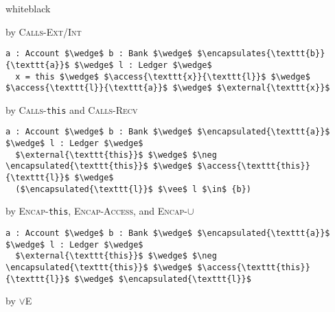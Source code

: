 \begin{proofBox}{white}{black}
\begin{minipage}{0.75\textwidth}
\end{minipage}
\begin{minipage}{0.24\textwidth}
\scriptsize
\hfill by \textsc{Calls-Ext/Int}
\end{minipage}
\begin{minipage}{0.75\textwidth}
\begin{lstlisting}[language = Chainmail, mathescape=true]
a : Account $\wedge$ b : Bank $\wedge$ $\encapsulates{\texttt{b}}{\texttt{a}}$ $\wedge$ l : Ledger $\wedge$ 
  x = this $\wedge$ $\access{\texttt{x}}{\texttt{l}}$ $\wedge$ $\access{\texttt{l}}{\texttt{a}}$ $\wedge$ $\external{\texttt{x}}$
\end{lstlisting}
\end{minipage}
\begin{minipage}{0.24\textwidth}
\scriptsize
\hfill by \textsc{Calls-}\texttt{this} and \textsc{Calls-Recv}
\end{minipage}
\begin{minipage}{0.75\textwidth}
\begin{lstlisting}[language = Chainmail, mathescape=true]
a : Account $\wedge$ b : Bank $\wedge$ $\encapsulated{\texttt{a}}$ $\wedge$ l : Ledger $\wedge$
  $\external{\texttt{this}}$ $\wedge$ $\neg \encapsulated{\texttt{this}}$ $\wedge$ $\access{\texttt{this}}{\texttt{l}}$ $\wedge$ 
  ($\encapsulated{\texttt{l}}$ $\vee$ l $\in$ {b})
\end{lstlisting}
\end{minipage}
\begin{minipage}{0.24\textwidth}
\scriptsize
\hfill by \textsc{Encap-}\texttt{this}, \textsc{Encap-Access}, and \textsc{Encap-}$\cup$
\end{minipage}
\begin{minipage}{0.75\textwidth}
\begin{lstlisting}[language = Chainmail, mathescape=true]
a : Account $\wedge$ b : Bank $\wedge$ $\encapsulated{\texttt{a}}$ $\wedge$ l : Ledger $\wedge$ 
  $\external{\texttt{this}}$ $\wedge$ $\neg \encapsulated{\texttt{this}}$ $\wedge$ $\access{\texttt{this}}{\texttt{l}}$ $\wedge$ $\encapsulated{\texttt{l}}$
\end{lstlisting}
\end{minipage}
\begin{minipage}{0.24\textwidth}
\scriptsize
\hfill by $\vee$\textsc{E}
\end{minipage}
\begin{minipage}{0.75\textwidth}
\begin{lstlisting}[language = Chainmail, mathescape=true]

\end{lstlisting}
\end{minipage}
\end{proofBox}
